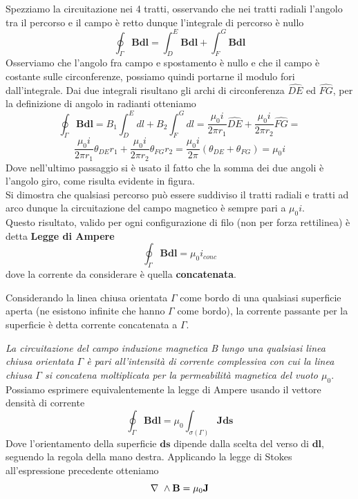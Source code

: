 \documentclass[
10pt, %
a4paper, %
oneside, %
headinclude,footinclude, %
BCOR5mm, %
]{scrartcl}
\begin{document}
\FloatBarrier
Spezziamo la circuitazione nei 4 tratti, osservando che nei tratti radiali l'angolo tra il percorso e il campo è retto dunque l'integrale di percorso è nullo
\[\oint_{\Gamma}\mathbf{B}\mathbf{dl}=\int_{D}^{E}\mathbf{B}\mathbf{dl}+\int_{F}^{G}\mathbf{B}\mathbf{dl}\]
Osserviamo che l'angolo fra campo e spostamento è nullo e che il campo è costante sulle circonferenze, possiamo quindi portarne il modulo fori dall'integrale. Dai due integrali risultano gli archi di circonferenza \(\widehat{DE}\) ed \(\widehat{FG}\), per la definizione di angolo in radianti otteniamo
\[\oint_{\Gamma}\mathbf{B}\mathbf{dl}=B_1\int_{D}^{E}dl+B_2\int_{F}^{G}dl= \frac{\mu_0 i}{2\pi r_1}\widehat{DE}+\frac{\mu_0 i}{2\pi r_2}\widehat{FG}=\]
 \[\frac{\mu_0 i}{2\pi r_1}\theta_{DE}r_1+\frac{\mu_0 i}{2\pi r_2}\theta_{FG}r_2=\frac{\mu_0 i}{2\pi}(\theta_{DE}+\theta_{FG})=\mu_0 i \]
Dove nell'ultimo passaggio si è usato il fatto che la somma dei due angoli è l'angolo giro, come risulta evidente in figura.\\
Si dimostra che qualsiasi percorso può essere suddiviso il tratti radiali e tratti ad arco dunque la circuitazione del campo magnetico è sempre pari a \(\mu_0 i\).\\
Questo risultato, valido per ogni configurazione di filo (non per forza rettilinea) è detta \textbf{Legge di Ampere}
\[\oint_{\Gamma}\mathbf{B}\mathbf{dl}=\mu_0 i_{conc}\] 
dove la corrente da considerare è quella \textbf{concatenata}.
\begin{definizione}
	Considerando la linea chiusa orientata $\Gamma$ come bordo di una qualsiasi superficie aperta (ne esistono infinite che hanno $\Gamma$ come bordo), la corrente passante per la superficie è detta corrente concatenata a $\Gamma$.
\end{definizione}
\textit{La circuitazione del campo induzione magnetica B lungo una qualsiasi linea chiusa orientata \(\Gamma\) è pari all'intensità di corrente complessiva con cui la linea chiusa $\Gamma$ si concatena moltiplicata per la permeabilità magnetica del vuoto $\mu_0$}.\\
Possiamo esprimere equivalentemente la legge di Ampere usando il vettore densità di corrente
\[\oint_{\Gamma}\mathbf{B}\mathbf{dl}= \mu_0\int_{\sigma(\Gamma)}\mathbf{J}\mathbf{ds}\]
Dove l'orientamento della superficie $\mathbf{ds}$ dipende dalla scelta del verso di $\mathbf{dl}$, seguendo la regola della mano destra. 
Applicando la legge di Stokes all'espressione precedente otteniamo
\[\mathbf{\nabla\ }\wedge\mathbf{B}=\mu_0\mathbf{J}\]
\end{document}
